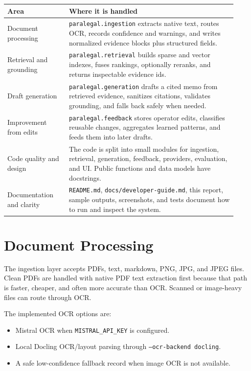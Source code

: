 \documentclass[11pt]{article}
\newcommand{\code}[1]{\texttt{#1}}
\begin{document}
\begin{longtable}{>{\raggedright\arraybackslash}p{0.25\linewidth} >{\raggedright\arraybackslash}p{0.68\linewidth}}
\toprule
\textbf{Area} & \textbf{Where it is handled} \\
\midrule
Document processing & \code{paralegal.ingestion} extracts native text, routes OCR, records confidence and warnings, and writes normalized evidence blocks plus structured fields. \\
Retrieval and grounding & \code{paralegal.retrieval} builds sparse and vector indexes, fuses rankings, optionally reranks, and returns inspectable evidence ids. \\
Draft generation & \code{paralegal.generation} drafts a cited memo from retrieved evidence, sanitizes citations, validates grounding, and falls back safely when needed. \\
Improvement from edits & \code{paralegal.feedback} stores operator edits, classifies reusable changes, aggregates learned patterns, and feeds them into later drafts. \\
Code quality and design & The code is split into small modules for ingestion, retrieval, generation, feedback, providers, evaluation, and UI. Public functions and data models have docstrings. \\
Documentation and clarity & \code{README.md}, \code{docs/developer-guide.md}, this report, sample outputs, screenshots, and tests document how to run and inspect the system. \\
\bottomrule
\end{longtable}

\section{Document Processing}

The ingestion layer accepts PDFs, text, markdown, PNG, JPG, and JPEG files. Clean PDFs are handled with native PDF text extraction first because that path is faster, cheaper, and often more accurate than OCR. Scanned or image-heavy files can route through OCR.

The implemented OCR options are:

\begin{itemize}
  \item Mistral OCR when \code{MISTRAL\_API\_KEY} is configured.
  \item Local Docling OCR/layout parsing through \code{--ocr-backend docling}.
  \item A safe low-confidence fallback record when image OCR is not available.
\end{itemize}
\end{document}
